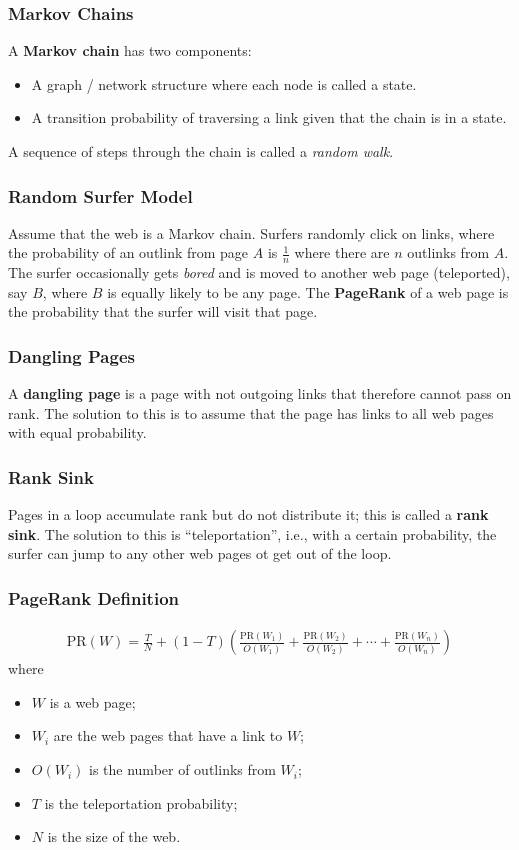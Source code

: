\documentclass[a4paper,11pt]{article}
\begin{document}
\subsubsection{Markov Chains}
A \textbf{Markov chain} has two components:
\begin{itemize}
    \item   A graph / network structure where each node is called a state.
    \item   A transition probability of traversing a link given that the chain is in a state.
\end{itemize}

A sequence of steps through the chain is called a \textit{random walk}.

\subsubsection{Random Surfer Model}
Assume that the web is a Markov chain.
Surfers randomly click on links, where the probability of an outlink from page $A$ is $\frac{1}{n}$ where there are $n$ outlinks from $A$.
The surfer occasionally gets \textit{bored} and is moved to another web page (teleported), say $B$, where $B$ is equally likely to be any page.
The \textbf{PageRank} of a web page is the probability that the surfer will visit that page.

\subsubsection{Dangling Pages}
A \textbf{dangling page} is a page with not outgoing links that therefore cannot pass on rank.
The solution to this is to assume that the page has links to all web pages with equal probability.

\subsubsection{Rank Sink}
Pages in a loop accumulate rank but do not distribute it; this is called a \textbf{rank sink}.
The solution to this is ``teleportation'', i.e., with a certain probability, the surfer can jump to any other web pages ot get out of the loop. 

\subsubsection{PageRank Definition}
\begin{align*}
    \text{PR}(W) = \frac{T}{N} + \left( 1 - T \right) \left( \frac{\text{PR}(W_1)}{O(W_1)} + \frac{\text{PR}(W_2)}{O(W_2)}  + \cdots + \frac{\text{PR}(W_n)}{O(W_n)} \right)
\end{align*}
where 
\begin{itemize}
    \item   $W$ is a web page;
    \item   $W_i$ are the web pages that have a link to $W$;
    \item   $O(W_i)$ is the number of outlinks from $W_i$;
    \item   $T$ is the teleportation probability;
    \item   $N$ is the size of the web.
\end{itemize}
\end{document}
